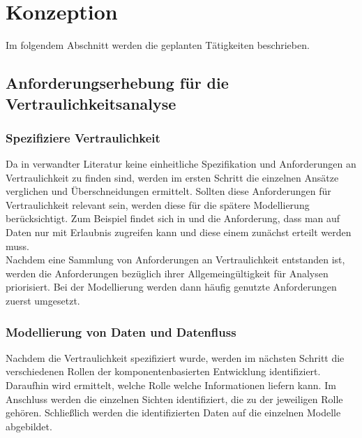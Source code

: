 

\chapter{Konzeption}
\label{ch:Konzeption}
Im folgendem Abschnitt werden die geplanten Tätigkeiten beschrieben.
\section{Anforderungserhebung für die Vertraulichkeitsanalyse}
\subsection{Spezifiziere Vertraulichkeit}
\label{subch:SpezifiziereVertraulichkeit}
Da in verwandter Literatur keine einheitliche Spezifikation und Anforderungen an Vertraulichkeit zu finden sind, werden im ersten Schritt die einzelnen Ansätze verglichen und Überschneidungen ermittelt. Sollten diese Anforderungen für Vertraulichkeit relevant sein, werden diese für die spätere Modellierung berücksichtigt. Zum Beispiel findet sich in \cite{Jurjens2005} und \cite{Kramer} die Anforderung, dass man auf Daten nur mit Erlaubnis zugreifen kann und diese einem zunächst erteilt werden muss. \\
Nachdem eine Sammlung von Anforderungen an Vertraulichkeit entstanden ist, werden die Anforderungen bezüglich ihrer Allgemeingültigkeit für Analysen priorisiert. Bei der Modellierung werden dann häufig genutzte Anforderungen zuerst umgesetzt.


\subsection{Modellierung von Daten und Datenfluss}
Nachdem die Vertraulichkeit spezifiziert wurde, werden im nächsten Schritt die verschiedenen Rollen der komponentenbasierten Entwicklung identifiziert. Daraufhin wird ermittelt, welche Rolle welche Informationen liefern kann. Im Anschluss werden die einzelnen Sichten identifiziert, die zu der jeweiligen Rolle gehören. Schließlich werden die identifizierten Daten auf die einzelnen Modelle abgebildet.

